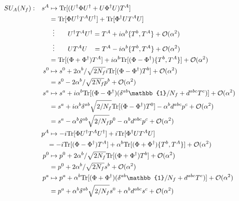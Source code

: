 \begin{subequations}
    \begin{align}
        &  & SU_A(N_f): &  & s^A& \mapsto \Tr[(U^\dagger\Phi U^\dagger+U\Phi^\dagger U)T^A]&&&\\
        &  &&  && = \Tr[\Phi U^\dagger T^AU^\dagger]+\Tr[\Phi^\dagger U T^AU]&&&\\
        &  &&  && \;\;\vdots\qquad U^\dagger T^AU^\dagger=T^A+\imagu\alpha^b\{T^b,T^A\}+\mathcal{O}(\alpha^2)&&&\\
        &  &&  && \;\;\vdots\qquad U T^AU\phantom{^\dagger\dagger}=T^A-\imagu\alpha^b\{T^b,T^A\}+\mathcal{O}(\alpha^2)&&&\\
        &  &&  && = \mathrlap{\Tr[(\Phi+\Phi^\dagger)T^A]+\imagu\alpha^b\Tr[(\Phi-\Phi^\dagger)\{T^b,T^A\}]+\mathcal{O}(\alpha^2)}&&&\\
        &  &&  &s^0& \mapsto s^0+2\alpha^b/\sqrt{2N_f}\imagu\Tr[(\Phi-\Phi^\dagger)T^b]+\mathcal{O}(\alpha^2)&&&\\
        &  &&  && = s^0-2\alpha^b/\sqrt{2N_f}p^b+\mathcal{O}(\alpha^2)&&&\\
        &  &&  &s^a&\mapsto s^a+\imagu\alpha^b\Tr[(\Phi-\Phi^\dagger)(\delta^{ab}\mathbb{1}/N_f+d^{abc}T^c)]+\mathcal{O}(\alpha^2)&\\
        &  &&  &&= s^a+\imagu\alpha^b\delta^{ab}\sqrt{2/N_f}\Tr[(\Phi-\Phi^\dagger)T^0]-\alpha^bd^{abc}p^c+\mathcal{O}(\alpha^2)&\\
        &  &&  &&= s^a-\alpha^b\delta^{ab}\sqrt{2/N_f}p^0-\alpha^bd^{abc}p^c+\mathcal{O}(\alpha^2)&\\
        &  & &  & p^A& \mapsto -\imagu\Tr[\Phi U^\dagger T^AU^\dagger]+\imagu\Tr[\Phi^\dagger U T^AU]&&&\\
        &  &&  && \mathrlap{= -\imagu\Tr[(\Phi-\Phi^\dagger)T^A]+\alpha^b\Tr[(\Phi+\Phi^\dagger)\{T^b,T^A\}]+\mathcal{O}(\alpha^2)}&&&\\
        &  &&  &p^0& \mapsto p^0+2\alpha^b/\sqrt{2N_f}\Tr[(\Phi+\Phi^\dagger)T^b]+\mathcal{O}(\alpha^2)&&&\\
        &  &&  && = p^0+2\alpha^b/\sqrt{2N_f}s^b+\mathcal{O}(\alpha^2)&&&\\
        &  &&  &p^a&\mapsto p^a+\alpha^b\Tr[(\Phi+\Phi^\dagger)(\delta^{ab}\mathbb{1}/N_f+d^{abc}T^c)]+\mathcal{O}(\alpha^2)&&&\\
        &  &&  &&= p^a+\alpha^b\delta^{ab}\sqrt{2/N_f}s^0+\alpha^bd^{abc}s^c+\mathcal{O}(\alpha^2)&&&
    \end{align}
\end{subequations}

